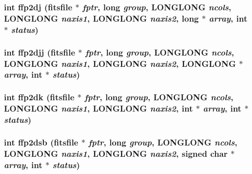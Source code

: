 \subsubsection{\setlength{\rightskip}{0pt plus 5cm}int ffp2dj (\bf{fitsfile} $\ast$ {\em fptr}, long {\em group}, \bf{LONGLONG} {\em ncols}, \bf{LONGLONG} {\em naxis1}, \bf{LONGLONG} {\em naxis2}, long $\ast$ {\em array}, int $\ast$ {\em status})}\label{test_2shm__client_2fitsio_8h_bedbc492a2862dcbe85415d0f5963a92}


\subsubsection{\setlength{\rightskip}{0pt plus 5cm}int ffp2djj (\bf{fitsfile} $\ast$ {\em fptr}, long {\em group}, \bf{LONGLONG} {\em ncols}, \bf{LONGLONG} {\em naxis1}, \bf{LONGLONG} {\em naxis2}, \bf{LONGLONG} $\ast$ {\em array}, int $\ast$ {\em status})}\label{test_2shm__client_2fitsio_8h_e377ad35a13d57c75f0f3e0f27be7e39}


\subsubsection{\setlength{\rightskip}{0pt plus 5cm}int ffp2dk (\bf{fitsfile} $\ast$ {\em fptr}, long {\em group}, \bf{LONGLONG} {\em ncols}, \bf{LONGLONG} {\em naxis1}, \bf{LONGLONG} {\em naxis2}, int $\ast$ {\em array}, int $\ast$ {\em status})}\label{test_2shm__client_2fitsio_8h_5cd35b8cecc698e509678e88cff3c92c}


\subsubsection{\setlength{\rightskip}{0pt plus 5cm}int ffp2dsb (\bf{fitsfile} $\ast$ {\em fptr}, long {\em group}, \bf{LONGLONG} {\em ncols}, \bf{LONGLONG} {\em naxis1}, \bf{LONGLONG} {\em naxis2}, signed char $\ast$ {\em array}, int $\ast$ {\em status})}\label{test_2shm__client_2fitsio_8h_e6a70017924d08f130af5f122d7b610e}


